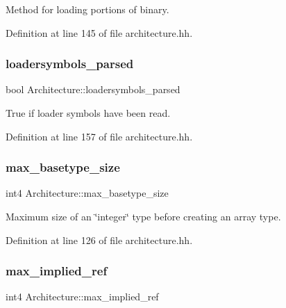 Method for loading portions of binary. 



Definition at line 145 of file architecture.\+hh.

\mbox{\label{class_architecture_aff44e0cd6303a22689d6601fc5418918}} 
\subsubsection{\texorpdfstring{loadersymbols\_parsed}{loadersymbols\_parsed}}
{\footnotesize\ttfamily bool Architecture\+::loadersymbols\+\_\+parsed}



True if loader symbols have been read. 



Definition at line 157 of file architecture.\+hh.

\mbox{\label{class_architecture_a37de4bf5cb39955f32a24074e768a591}} 
\subsubsection{\texorpdfstring{max\_basetype\_size}{max\_basetype\_size}}
{\footnotesize\ttfamily int4 Architecture\+::max\+\_\+basetype\+\_\+size}



Maximum size of an \char`\"{}integer\char`\"{} type before creating an array type. 



Definition at line 126 of file architecture.\+hh.

\mbox{\label{class_architecture_a6c32c1c7e592435d70f41145d5c548f1}} 
\subsubsection{\texorpdfstring{max\_implied\_ref}{max\_implied\_ref}}
{\footnotesize\ttfamily int4 Architecture\+::max\+\_\+implied\+\_\+ref}



